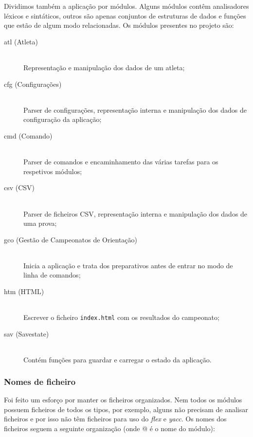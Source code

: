 \documentclass[11pt, a4paper, oneside]{article}
\begin{document}
Dividimos também a aplicação por módulos. Alguns módulos contêm analisadores léxicos e sintáticos, outros são apenas conjuntos de estruturas de dados e funções que estão de algum modo relacionadas. Os módulos presentes no projeto são:
\begin{description}
\item[atl (Atleta)] \hfill \\
	Representação e manipulação dos dados de um atleta;
	
\item[cfg (Configurações)] \hfill \\
	Parser de configurações, representação interna e manipulação dos dados de configuração da aplicação;

\item[cmd (Comando)] \hfill \\
	Parser de comandos e encaminhamento das várias tarefas para os respetivos módulos;

\item[csv (CSV)] \hfill \\
	Parser de ficheiros CSV, representação interna e manipulação dos dados de uma prova;

\item[gco (Gestão de Campeonatos de Orientação)] \hfill \\
	Inicia a aplicação e trata dos preparativos antes de entrar no modo de linha de comandos;
	
\item[htm (HTML)] \hfill \\
	Escrever o ficheiro \texttt{index.html} com os resultados do campeonato;
	
\item[sav (Savestate)] \hfill \\
	Contém funções para guardar e carregar o estado da aplicação.
\end{description}

\newpage

\subsubsection{Nomes de ficheiro}

Foi feito um esforço por manter os ficheiros organizados. Nem todos os módulos possuem ficheiros de todos os tipos, por exemplo, alguns não precisam de analisar ficheiros e por isso não têm ficheiros para uso do \emph{flex} e \emph{yacc}. Os nomes dos ficheiros seguem a seguinte organização (onde @ é o nome do módulo):
\end{document}
